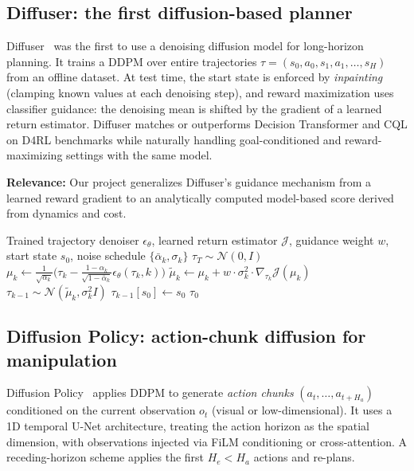 \documentclass[11pt,letterpaper]{article}
\theoremstyle{plain}
\theoremstyle{definition}
\theoremstyle{remark}
\newcommand{\calN}{\mathcal{N}}
\newcommand{\grad}{\nabla}
\begin{document}
\subsection{Diffuser: the first diffusion-based planner}

Diffuser~\citep{janner2022} was the first to use a denoising diffusion
model for long-horizon planning.  It trains a DDPM over entire
trajectories $\tau=(s_0,a_0,s_1,a_1,\ldots,s_H)$ from an offline
dataset.  At test time, the start state is enforced by
\emph{inpainting} (clamping known values at each denoising step), and
reward maximization uses classifier guidance: the denoising mean is
shifted by the gradient of a learned return estimator.  Diffuser
matches or outperforms Decision Transformer and CQL on D4RL benchmarks
while naturally handling goal-conditioned and reward-maximizing
settings with the same model.

\textbf{Relevance:} Our project generalizes Diffuser's guidance
mechanism from a learned reward gradient to an analytically computed
model-based score derived from dynamics and cost.

\begin{algorithm}[ht]
\caption{Diffuser: Classifier-Guided Trajectory Planning}\label{alg:diffuser}
\begin{algorithmic}[1]
\Require Trained trajectory denoiser $\epsilon_\theta$, learned return estimator $\mathcal{J}$,
  guidance weight $w$, start state $s_0$, noise schedule $\{\bar\alpha_k,\sigma_k\}$
\State $\tau_T\sim\calN(0,I)$ 
  \State $\mu_k\gets\frac{1}{\sqrt{\alpha_k}}\bigl(\tau_k-\frac{1-\alpha_k}{\sqrt{1-\bar\alpha_k}}\epsilon_\theta(\tau_k,k)\bigr)$
  \State $\tilde\mu_k\gets\mu_k+w\cdot\sigma_k^2\cdot\grad_{\tau_k}\mathcal{J}(\mu_k)$
  \State $\tau_{k-1}\sim\calN(\tilde\mu_k,\sigma_k^2 I)$
  \State $\tau_{k-1}[s_0]\gets s_0$ 
\EndFor
\State \Return $\tau_0$ 
\end{algorithmic}
\end{algorithm}

\subsection{Diffusion Policy: action-chunk diffusion for manipulation}

Diffusion Policy~\citep{chi2023diffusionpolicy} applies DDPM to
generate \emph{action chunks} $(a_t,\ldots,a_{t+H_a})$ conditioned on
the current observation $o_t$ (visual or low-dimensional).  It uses a
1D temporal U-Net architecture, treating the action horizon as the
spatial dimension, with observations injected via FiLM conditioning or
cross-attention.  A receding-horizon scheme applies the first
$H_e<H_a$ actions and re-plans.
\end{document}

